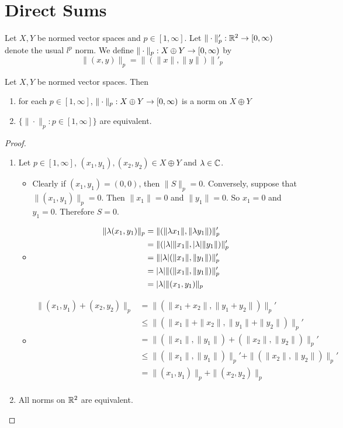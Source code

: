 \documentclass{book}
\begin{document}
	
	
	
	
	
	\newpage
	\section{Direct Sums}
	
	\begin{defn} \ld{}
	Let $X, Y$ be normed vector spaces and $p \in [1, \infty]$. Let $\| \cdot \|'_p: \mathbb{R}^2 \rightarrow [0, \infty)$ denote the usual $l^p$ norm. We define $\| \cdot \|_p : X \oplus Y \rightarrow [0,\infty)$ by $$\|(x, y) \|_p = \|( \|x\|, \| y \|) \|'_ p$$
	\end{defn}
	
	\begin{ex} \lex{}	
	Let $X, Y$  be normed vector spaces. Then 
	\begin{enumerate}
	\item for each $p \in [1, \infty]$, $\|\cdot\|_p: X \oplus Y \rightarrow [0,\infty)$ is a norm on $X \oplus Y$
	\item  $\{\|\cdot \|_p:  p \in [1, \infty]\}$ are equivalent. 
	\end{enumerate}
	\end{ex}
	
	\begin{proof}\
	\begin{enumerate}
	\item Let $p \in [1, \infty]$, $(x_1,y_1), (x_2,y_2) \in X \oplus Y$ and $\lambda \in \mathbb{C}$.
	\begin{itemize}
	\item Clearly if $(x_1, y_1) = (0,0)$, then $\|S\|_p = 0$. Conversely, suppose that $\|(x_1, y_1)\|_p = 0$. Then $\|x_1\| = 0$ and $\|y_1\| = 0$. So $x_1 = 0$ and $y_1 = 0$. Therefore $S = 0$. 
	\item 
	\begin{align*}
	\|\lambda (x_1, y_1)\|_p
	&= \|(\|\lambda x_1\|, \|\lambda y_1\|)\|_p' \\
	&= \|(|\lambda|\| x_1\|, |\lambda|\|y_1 \|)\|_p' \\
	&= \||\lambda| (\| x_1\|,\|y_1\| )\|_p' \\
	&= |\lambda| \|(\| x_1\|,\|y_1\|)\|_p' \\
	&= |\lambda| \| (x_1, y_1)\|_p
	\end{align*}
	\item 
	\begin{align*}
	\|(x_1, y_1) + (x_2, y_2)\|_p
	&= \|(\|x_1 + x_2\|, \|y_1 + y_2\|)\|_p' \\
	&\leq \|(\|x_1\| + \|x_2\|, \|y_1\| + \|y_2\|)\|_p' \\
	&= \|(\|x_1\|, \|y_1\|) + (\|x_2\|, \|y_2\|)\|_p' \\
	&\leq \|(\|x_1\|, \|y_1\|)\|_p' + \|(\|x_2\|, \|y_2\|)\|_p' \\
	&= \|(x_1, y_1)\|_p + \|(x_2, y_2)\|_p \\ 
	\end{align*}
	\end{itemize}
	\item All norms on $\mathbb{R}^2$ are equivalent.
	\end{enumerate}
\end{proof}		
\end{document}
